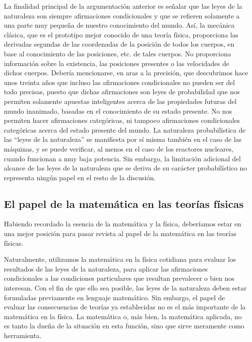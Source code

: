\documentclass[a4paper, 12pt]{article}
\begin{document}
La finalidad principal de la argumentación anterior es señalar que las leyes de la naturaleza son siempre afirmaciones condicionales y que se refieren solamente a una parte muy pequeña de nuestro conocimiento del mundo. Así, la mecánica clásica, que es el prototipo mejor conocido de una teoría física, proporciona las derivadas segundas de las coordenadas de la posición de todos los cuerpos, en base al conocimiento de las posiciones, etc. de tales cuerpos. No proporciona información sobre la existencia, las posiciones presentes o las velocidades de dichos cuerpos. Debería mencionarse, en aras a la precisión, que descubrimos hace unos treinta años que incluso las afirmaciones condicionales no pueden ser del todo precisas, puesto que dichas afirmaciones son leyes de probabilidad que nos permiten solamente apuestas inteligentes acerca de las propiedades futuras del mundo inanimado, basadas en el conocimiento de su estado presente. No nos permiten hacer afirmaciones categóricas, ni tampoco afirmaciones condicionales categóricas acerca del estado presente del mundo. La naturaleza probabilística de las ``leyes de la naturaleza'' se manifiesta por sí misma también en el caso de las máquinas, y se puede verificar, al menos en el caso de los reactores nucleares, cuando funcionan a muy baja potencia. Sin embargo, la limitación adicional del alcance de las leyes de la naturaleza que se deriva de su carácter probabilístico no representa ningún papel en el resto de la discusión.

\subsection*{El papel de la matemática en las teorías físicas}

Habiendo recordado la esencia de la matemática y la física, deberíamos estar en una mejor posición para pasar revista al papel de la matemática en las teorías físicas.

Naturalmente, utilizamos la matemática en la física cotidiana para evaluar los resultados de las leyes de la naturaleza, para aplicar las afirmaciones condicionales a las condiciones particulares que resultan prevalecer o bien nos interesan. Con el fin de que ello sea posible, las leyes de la naturaleza deben estar formuladas previamente en lenguaje matemático. Sin embargo, el papel de evaluar las consecuencias de teorías ya establecidas no es el más importante de la matemática en la física. La matemática o, más bien, la matemática aplicada, no es tanto la dueña de la situación en esta función, sino que sirve meramente como herramienta.
\end{document}

